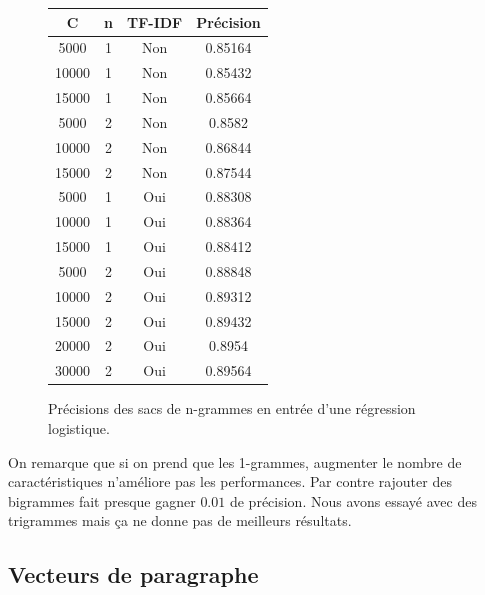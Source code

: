 \documentclass{article}
\begin{document}
\begin{figure}[h]
\begin{center}
\begin{tabular}{|c|c|c|c|}
	\hline
	C & n & TF-IDF & Précision \\
	\hline
	5000 & 1 & Non & 0.85164 \\
	\hline
	10000 & 1 & Non & 0.85432 \\
	\hline
	15000 & 1 & Non & 0.85664 \\
	\hline
	\hline
	5000 & 2 & Non & 0.8582 \\
	\hline
	10000 & 2 & Non & 0.86844 \\
	\hline
	15000 & 2 & Non & 0.87544 \\
	\hline
	\hline
	5000 & 1 & Oui & 0.88308 \\
	\hline
	10000 & 1 & Oui & 0.88364 \\
	\hline
	15000 & 1 & Oui & 0.88412 \\
	\hline
	\hline
	5000 & 2 & Oui & 0.88848 \\
	\hline
	10000 & 2 & Oui & 0.89312 \\
	\hline
	15000 & 2 & Oui & 0.89432 \\
	\hline
	20000 & 2 & Oui & 0.8954 \\
	\hline
	30000 & 2 & Oui & 0.89564 \\
	\hline
\end{tabular}
\caption{Précisions des sacs de n-grammes en entrée d'une régression logistique.}
\label{results_ngram}
\end{center}
\end{figure}

On remarque que si on prend que les 1-grammes, augmenter le nombre de caractéristiques n'améliore pas les performances. Par contre rajouter des bigrammes fait presque gagner $0.01$ de précision. Nous avons essayé avec des trigrammes mais ça ne donne pas de meilleurs résultats.

\subsection{Vecteurs de paragraphe}
\end{document}
